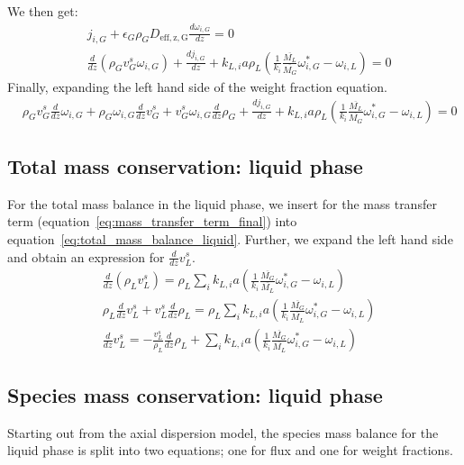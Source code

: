 \documentclass{article}
\begin{document}
We then get:
\begin{equation}
	\begin{split}
	& j_{i,G} + \epsilon_G \rho_G D_{\mathrm{eff,z,G}}\frac{d\omega_{i,G}}{dz} = 0\\
	&\frac{d}{dz}\left(\rho_G v_G^s \omega_{i,G} \right) + \frac{dj_{i,G}}{dz} + k_{L,i}a\rho_L(\frac{1}{k_i}\frac{\overline{M_L}}{\overline{M_G}}\omega_{i,G}^*-\omega_{i,L}) = 0
	\end{split}
\end{equation}
Finally, expanding the left hand side of the weight fraction equation.
	\begin{equation}
	\begin{split}
	&\rho_Gv_G^s\frac{d}{dz}\omega_{i,G} + \rho_G\omega_{i,G} \frac{d}{dz}v_G^s + v_G^s \omega_{i,G} \frac{d}{dz}\rho_G + \frac{dj_{i,G}}{dz} + k_{L,i}a\rho_L(\frac{1}{k_i}\frac{\overline{M_L}}{\overline{M_G}}\omega_{i,G}^*-\omega_{i,L}) = 0
	\end{split}
\end{equation}


\subsection{Total mass conservation: liquid phase}

For the total mass balance in the liquid phase, we insert for the mass transfer term (equation~\ref{eq:mass_transfer_term_final}) into equation~\ref{eq:total_mass_balance_liquid}. Further, we expand the left hand side and obtain an expression for $\frac{d}{dz}v_L^s$.
\begin{equation}
	\begin{split}
	&\frac{d}{dz}\left(\rho_Lv_L^s\right) =\rho_L\sum_ik_{L,i}a(\frac{1}{k_i}\frac{\overline{M_G}}{\overline{M_L}}\omega_{i,G}^*-\omega_{i,L}) \\
	&\rho_L\frac{d}{dz}v_L^s + v_L^s\frac{d}{dz}\rho_L = \rho_L\sum_ik_{L,i}a(\frac{1}{k_i}\frac{\overline{M_G}}{\overline{M_L}}\omega_{i,G}^*-\omega_{i,L}) \\
	&\frac{d}{dz}v_L^s = -\frac{v_L^s}{\rho_L}\frac{d}{dz}\rho_L + \sum_ik_{L,i}a(\frac{1}{k_i}\frac{\overline{M_G}}{\overline{M_L}}\omega_{i,G}^*-\omega_{i,L})
	\label{eq:total_mass_balance_liquid_manipulations}
	\end{split}
\end{equation}

\subsection{Species mass conservation: liquid phase}
Starting out from the axial dispersion model, the species mass balance for the liquid phase is split into two equations; one for flux and one for weight fractions.
\end{document}
